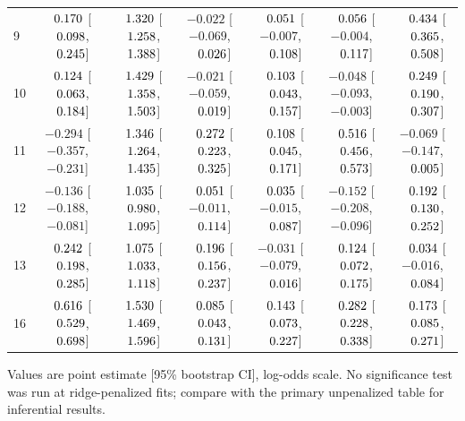 \begin{table}[htbp]
{\begin{tabular}{lcccccc}
9 & $\hphantom{-}0.170$ [$\hphantom{-}0.098$, $\hphantom{-}0.245$] & $\hphantom{-}1.320$ [$\hphantom{-}1.258$, $\hphantom{-}1.388$] & $-0.022$ [$-0.069$, $\hphantom{-}0.026$] & $\hphantom{-}0.051$ [$-0.007$, $\hphantom{-}0.108$] & $\hphantom{-}0.056$ [$-0.004$, $\hphantom{-}0.117$] & $\hphantom{-}0.434$ [$\hphantom{-}0.365$, $\hphantom{-}0.508$] \\
10 & $\hphantom{-}0.124$ [$\hphantom{-}0.063$, $\hphantom{-}0.184$] & $\hphantom{-}1.429$ [$\hphantom{-}1.358$, $\hphantom{-}1.503$] & $-0.021$ [$-0.059$, $\hphantom{-}0.019$] & $\hphantom{-}0.103$ [$\hphantom{-}0.043$, $\hphantom{-}0.157$] & $-0.048$ [$-0.093$, $-0.003$] & $\hphantom{-}0.249$ [$\hphantom{-}0.190$, $\hphantom{-}0.307$] \\
11 & $-0.294$ [$-0.357$, $-0.231$] & $\hphantom{-}1.346$ [$\hphantom{-}1.264$, $\hphantom{-}1.435$] & $\hphantom{-}0.272$ [$\hphantom{-}0.223$, $\hphantom{-}0.325$] & $\hphantom{-}0.108$ [$\hphantom{-}0.045$, $\hphantom{-}0.171$] & $\hphantom{-}0.516$ [$\hphantom{-}0.456$, $\hphantom{-}0.573$] & $-0.069$ [$-0.147$, $\hphantom{-}0.005$] \\
12 & $-0.136$ [$-0.188$, $-0.081$] & $\hphantom{-}1.035$ [$\hphantom{-}0.980$, $\hphantom{-}1.095$] & $\hphantom{-}0.051$ [$-0.011$, $\hphantom{-}0.114$] & $\hphantom{-}0.035$ [$-0.015$, $\hphantom{-}0.087$] & $-0.152$ [$-0.208$, $-0.096$] & $\hphantom{-}0.192$ [$\hphantom{-}0.130$, $\hphantom{-}0.252$] \\
13 & $\hphantom{-}0.242$ [$\hphantom{-}0.198$, $\hphantom{-}0.285$] & $\hphantom{-}1.075$ [$\hphantom{-}1.033$, $\hphantom{-}1.118$] & $\hphantom{-}0.196$ [$\hphantom{-}0.156$, $\hphantom{-}0.237$] & $-0.031$ [$-0.079$, $\hphantom{-}0.016$] & $\hphantom{-}0.124$ [$\hphantom{-}0.072$, $\hphantom{-}0.175$] & $\hphantom{-}0.034$ [$-0.016$, $\hphantom{-}0.084$] \\
16 & $\hphantom{-}0.616$ [$\hphantom{-}0.529$, $\hphantom{-}0.698$] & $\hphantom{-}1.530$ [$\hphantom{-}1.469$, $\hphantom{-}1.596$] & $\hphantom{-}0.085$ [$\hphantom{-}0.043$, $\hphantom{-}0.131$] & $\hphantom{-}0.143$ [$\hphantom{-}0.073$, $\hphantom{-}0.227$] & $\hphantom{-}0.282$ [$\hphantom{-}0.228$, $\hphantom{-}0.338$] & $\hphantom{-}0.173$ [$\hphantom{-}0.085$, $\hphantom{-}0.271$] \\
\bottomrule
\end{tabular}
}
\vspace{4pt}
\par\noindent
\begin{minipage}{\linewidth}\small Values are point estimate [95\% bootstrap CI], log-odds scale. No significance test was run at ridge-penalized fits; compare with the primary unpenalized table for inferential results.\end{minipage}
\end{table}

